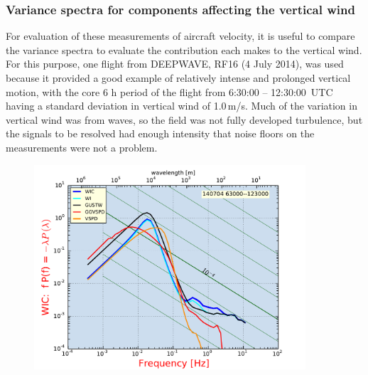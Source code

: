 \documentclass[12pt,twoside,english]{article}\usepackage[]{graphicx}\usepackage[]{color}
\let\OrgIndex\index
\renewcommand*{\index}[1]{\OrgIndex{#1}}
\begin{document}
{{\subsubsection{Variance spectra for components affecting the vertical wind\label{sub:Variance-spectra-for-W-components}}

For evaluation of these measurements of aircraft velocity, it is useful to compare the variance spectra to evaluate the contribution each makes to the vertical wind. For this purpose, one flight from DEEPWAVE, RF16 (4 July 2014), was used because it provided a good example of relatively intense and prolonged vertical motion, with the core 6 h period of the flight from 6:30:00 -- 12:30:00~UTC having a standard deviation in vertical wind of 1.0\,m/s. Much of the variation in vertical wind was from waves, so the field was not fully developed turbulence, but the signals to be resolved had enough intensity that noise floors on the measurements were not a problem. 

\begin{figure}
\noindent \begin{centering}
\includegraphics[width=0.9\textwidth]{SpecialGraphics/VSPDspectraDW16.pdf}  
\par\end{centering}


\end{figure}}}
\end{document}
